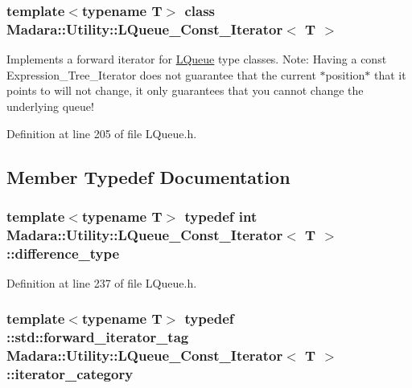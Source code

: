 \subsubsection*{template$<$typename T$>$ class Madara::Utility::LQueue\_\-Const\_\-Iterator$<$ T $>$}

Implements a forward iterator for \hyperlink{classMadara_1_1Utility_1_1LQueue}{LQueue} type classes. Note: Having a const Expression\_\-Tree\_\-Iterator does not guarantee that the current $\ast$position$\ast$ that it points to will not change, it only guarantees that you cannot change the underlying queue! 

Definition at line 205 of file LQueue.h.



\subsection{Member Typedef Documentation}
\hypertarget{classMadara_1_1Utility_1_1LQueue__Const__Iterator_afc45c2bca1a1b8d8667417f37cfb92ea}{
\subsubsection[{difference\_\-type}]{\setlength{\rightskip}{0pt plus 5cm}template$<$typename T$>$ typedef int {\bf Madara::Utility::LQueue\_\-Const\_\-Iterator}$<$ T $>$::{\bf difference\_\-type}}}
\label{d3/db7/classMadara_1_1Utility_1_1LQueue__Const__Iterator_afc45c2bca1a1b8d8667417f37cfb92ea}


Definition at line 237 of file LQueue.h.

\hypertarget{classMadara_1_1Utility_1_1LQueue__Const__Iterator_a254be8e39fab0c8c8a4573f8abc464a3}{
\subsubsection[{iterator\_\-category}]{\setlength{\rightskip}{0pt plus 5cm}template$<$typename T$>$ typedef ::std::forward\_\-iterator\_\-tag {\bf Madara::Utility::LQueue\_\-Const\_\-Iterator}$<$ T $>$::{\bf iterator\_\-category}}}
\label{d3/db7/classMadara_1_1Utility_1_1LQueue__Const__Iterator_a254be8e39fab0c8c8a4573f8abc464a3}


